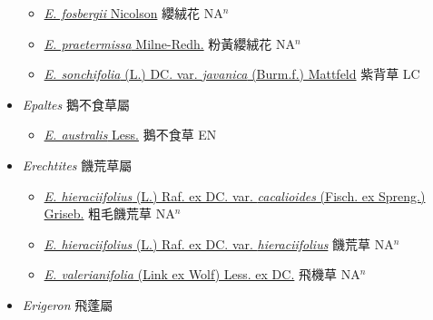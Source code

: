 \begin{itemize}
  \begin{itemize}
        \item[] \href{http://www.theplantlist.org/tpl1.1/search?q=Emilia+fosbergii}{\textit{E. fosbergii} Nicolson}   纓絨花 NA$^n$
        \item[] \href{http://www.theplantlist.org/tpl1.1/search?q=Emilia+praetermissa}{\textit{E. praetermissa} Milne-Redh.}   粉黃纓絨花 NA$^n$
        \item[] \href{http://www.theplantlist.org/tpl1.1/search?q=Emilia+sonchifolia+var.+javanica}{\textit{E. sonchifolia} (L.) DC. var. \textit{javanica} (Burm.f.) Mattfeld}   紫背草 LC
  \end{itemize}
 \item[] \textit{Epaltes} 鵝不食草屬
                    
  \begin{itemize}
        \item[] \href{http://www.theplantlist.org/tpl1.1/search?q=Epaltes+australis}{\textit{E. australis} Less.}   鵝不食草 EN
  \end{itemize}
 \item[] \textit{Erechtites} 饑荒草屬
                    
  \begin{itemize}
        \item[] \href{http://www.theplantlist.org/tpl1.1/search?q=Erechtites+hieraciifolius+var.+cacalioides}{\textit{E. hieraciifolius} (L.) Raf. ex DC. var. \textit{cacalioides} (Fisch. ex Spreng.) Griseb.}   粗毛饑荒草 NA$^n$
        \item[] \href{http://www.theplantlist.org/tpl1.1/search?q=Erechtites+hieraciifolius+var.+hieraciifolius}{\textit{E. hieraciifolius} (L.) Raf. ex DC. var. \textit{hieraciifolius}}   饑荒草 NA$^n$
        \item[] \href{http://www.theplantlist.org/tpl1.1/search?q=Erechtites+valerianifolia}{\textit{E. valerianifolia} (Link ex Wolf) Less. ex DC.}   飛機草 NA$^n$
  \end{itemize}
 \item[] \textit{Erigeron} 飛蓬屬
                    

\end{itemize}
